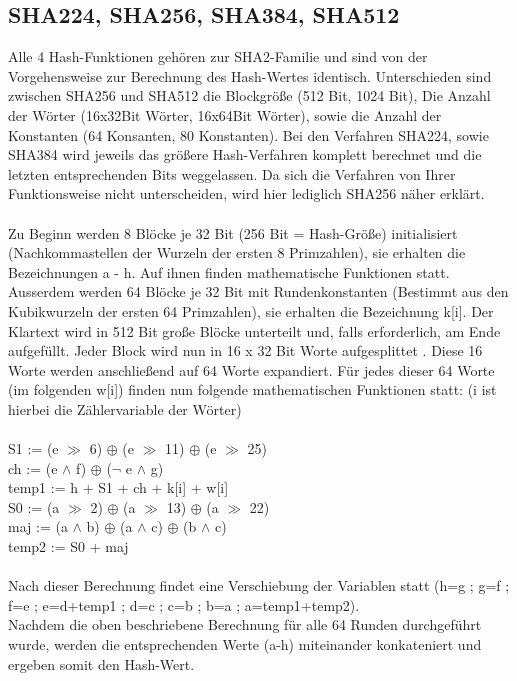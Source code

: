 \documentclass[10pt, a4paper,headsepline]{scrreprt}
\begin{document}
\subsection{SHA224, SHA256, SHA384, SHA512}
Alle 4 Hash-Funktionen gehören zur SHA2-Familie und sind von der Vorgehensweise zur Berechnung des Hash-Wertes identisch. Unterschieden sind zwischen SHA256 und SHA512 die Blockgröße (512 Bit, 1024 Bit), Die Anzahl der Wörter (16x32Bit Wörter, 16x64Bit Wörter), sowie die Anzahl der Konstanten (64 Konsanten, 80 Konstanten). Bei den Verfahren SHA224, sowie SHA384 wird jeweils das größere Hash-Verfahren komplett berechnet und die letzten entsprechenden Bits weggelassen. Da sich die Verfahren von Ihrer Funktionsweise nicht unterscheiden, wird hier lediglich SHA256 näher erklärt.  \\ \\
Zu Beginn werden 8 Blöcke je 32 Bit (256 Bit = Hash-Größe) initialisiert (Nachkommastellen der Wurzeln der ersten 8 Primzahlen), sie erhalten die Bezeichnungen a - h. Auf ihnen finden mathematische Funktionen statt. Ausserdem werden 64 Blöcke je 32 Bit mit Rundenkonstanten (Bestimmt aus den Kubikwurzeln der ersten 64 Primzahlen), sie erhalten die Bezeichnung k[i].
Der Klartext wird in 512 Bit große Blöcke unterteilt und, falls erforderlich, am Ende aufgefüllt. Jeder Block wird nun in 16 x 32 Bit Worte aufgesplittet . Diese 16 Worte werden anschließend auf 64 Worte expandiert. Für jedes dieser 64 Worte (im folgenden w[i]) finden nun folgende mathematischen Funktionen statt: (i ist hierbei die Zählervariable der Wörter) \\ \\
S1 := (e $\gg$ 6) $\oplus$ (e $\gg$ 11) $\oplus$ (e $\gg$ 25) \\
ch := (e $\land$ f) $\oplus$ ($\lnot$ e $\land$ g) \\
temp1 := h + S1 + ch + k[i] + w[i]\\
S0 := (a $\gg$ 2) $\oplus$ (a $\gg$ 13) $\oplus$ (a $\gg$ 22) \\
maj := (a $\land$ b) $\oplus$ (a $\land$ c) $\oplus$ (b $\land$ c) \\
temp2 := S0 + maj \\ \\
Nach dieser Berechnung findet eine Verschiebung der Variablen statt (h=g ; g=f ; f=e ; e=d+temp1 ; d=c ; c=b ; b=a ; a=temp1+temp2). \\
Nachdem die oben beschriebene Berechnung für alle 64 Runden durchgeführt wurde, werden die entsprechenden Werte (a-h) miteinander konkateniert und ergeben somit den Hash-Wert.
\end{document}
